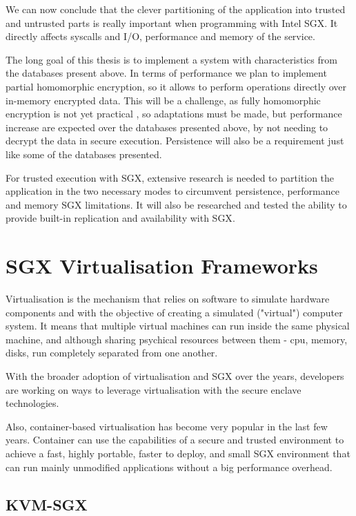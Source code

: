 We can now conclude that the clever partitioning of the application into trusted and untrusted parts is really important when programming with Intel \gls{SGX}. It directly affects \glspl{syscall} and \gls{I/O}, performance and memory of the service. 

The long goal of this thesis is to implement a system with characteristics from the databases present above. In terms of performance we plan to implement partial homomorphic encryption, so it allows to perform operations directly over in-memory encrypted data. This will be a challenge, as fully homomorphic encryption is not yet practical \cite{homomorphic:1}, so adaptations must be made, but performance increase are expected  over the databases presented above, by not needing to decrypt the data in secure execution. Persistence will also be a requirement just like some of the databases presented.

For trusted execution with \gls{SGX}, extensive research is needed to partition the application in the two necessary modes to circumvent persistence, performance and memory \gls{SGX} limitations. It will also be researched and tested the ability to provide built-in replication and availability with \gls{SGX}.

\section{SGX Virtualisation Frameworks}
\label{sec:sgx_virtualisation_frameworks}

Virtualisation is the mechanism that relies on software to simulate hardware components and with the objective of creating a simulated ("virtual") computer system. It means that multiple virtual machines can run inside the same physical machine, and although sharing psychical resources between them - cpu, memory, disks, run completely separated from one another.

With the broader adoption of virtualisation and \gls{SGX} over the years, developers are working on ways to leverage virtualisation with the secure enclave technologies.

Also, container-based virtualisation has become very popular in the last few years. Container can use the capabilities of a secure and trusted environment to achieve a fast, highly portable, faster to deploy, and small \gls{SGX} environment that can run mainly unmodified applications without a big performance overhead.

\subsection{KVM-SGX}
\label{ssec:KVM-SGX}

